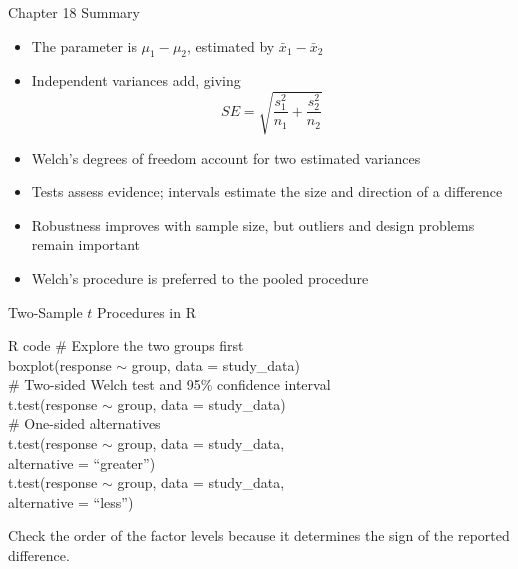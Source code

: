 \documentclass[aspectratio=169,10pt]{beamer}
\begin{document}
\begin{frame}{Chapter 18 Summary}
\begin{itemize}
  \item The parameter is $\mu_1-\mu_2$, estimated by $\bar{x}_1-\bar{x}_2$
  \item Independent variances add, giving
  \[
  SE=\sqrt{\frac{s_1^2}{n_1}+\frac{s_2^2}{n_2}}
  \]
  \item Welch's degrees of freedom account for two estimated variances
  \item Tests assess evidence; intervals estimate the size and direction of a difference
  \item Robustness improves with sample size, but outliers and design problems remain important
  \item Welch's procedure is preferred to the pooled procedure
\end{itemize}
\end{frame}

\begin{frame}{Two-Sample $t$ Procedures in R}
\begin{block}{R code}
\scriptsize\sffamily
\textcolor{CourseGreen}{\# Explore the two groups first} \\
boxplot(response $\sim$ group, data = study\_data) \\
\vspace{0.08cm}
\textcolor{CourseGreen}{\# Two-sided Welch test and 95\% confidence interval} \\
t.test(response $\sim$ group, data = study\_data) \\
\vspace{0.08cm}
\textcolor{CourseGreen}{\# One-sided alternatives} \\
t.test(response $\sim$ group, data = study\_data, \\
\hspace*{1.1cm}alternative = ``greater'') \\
t.test(response $\sim$ group, data = study\_data, \\
\hspace*{1.1cm}alternative = ``less'')
\end{block}

Check the order of the factor levels because it determines the sign of the reported difference.
\end{frame}
\end{document}
